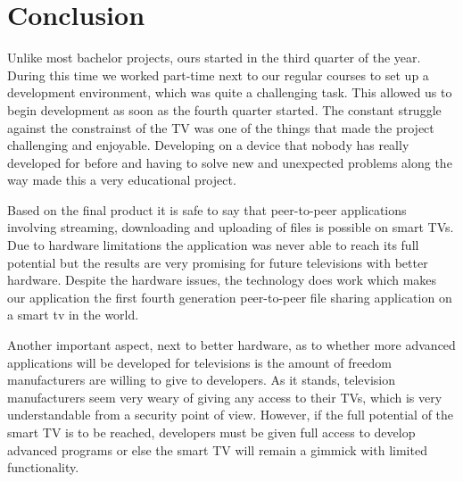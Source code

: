 \chapter{Conclusion}
Unlike most bachelor projects, ours started in the third quarter of the year. During this time we worked part-time next to our regular courses to set up a development environment, which was quite a challenging task. This allowed us to begin development as soon as the fourth quarter started. The constant struggle against the constrainst of the TV was one of the things that made the project challenging and enjoyable. Developing on a device that nobody has really developed for before and having to solve new and unexpected problems along the way made this a very educational project.

Based on the final product it is safe to say that peer-to-peer applications involving streaming, downloading and uploading of files is possible on smart TV\textquotesingle s. Due to hardware limitations the application was never able to reach its full potential but the results are very promising for future televisions with better hardware. Despite the hardware issues, the technology does work which makes our application the first fourth generation peer-to-peer file sharing application on a smart tv in the world.

Another important aspect, next to better hardware, as to whether more advanced applications will be developed for televisions is the amount of freedom manufacturers are willing to give to developers. As it stands, television manufacturers seem very weary of giving any access to their TV\textquotesingle s, which is very understandable from a security point of view. However, if the full potential of the smart TV is to be reached, developers must be given full access to develop advanced programs or else the smart TV will remain a gimmick with limited functionality.